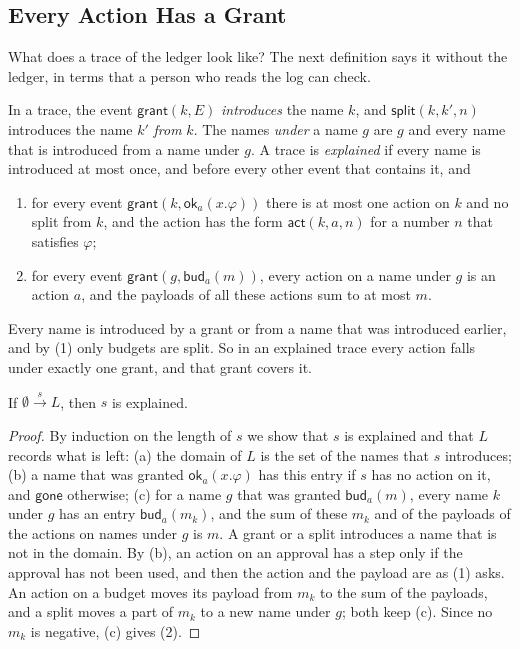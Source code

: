\documentclass[acmsmall,nonacm,screen]{acmart}
\newcommand{\kw}[1]{\mathsf{#1}}
\newcommand{\ok}[2]{\kw{ok}_{#1}(#2)}
\newcommand{\bud}[2]{\kw{bud}_{#1}(#2)}
\newcommand{\gone}{\kw{gone}}
\newcommand{\lstep}[1]{\xrightarrow{\,#1\,}}
\newcommand{\grant}{\kw{grant}}
\newcommand{\evact}{\kw{act}}
\newcommand{\evsplit}{\kw{split}}
\begin{document}
\subsection{Every Action Has a Grant}

What does a trace of the ledger look like? The next definition says it without the ledger, in
terms that a person who reads the log can check.

\begin{definition}
\label{def:explained}
In a trace, the event $\grant(k, E)$ \emph{introduces} the name $k$, and
$\evsplit(k, k', n)$ introduces the name $k'$ \emph{from} $k$. The names \emph{under} a name
$g$ are $g$ and every name that is introduced from a name under $g$. A trace is
\emph{explained} if every name is introduced at most once, and before every other event that
contains it, and
\begin{enumerate}
\item for every event $\grant(k, \ok{a}{x.\varphi})$ there is at most one action on $k$ and
  no split from $k$, and the action has the form $\evact(k, a, n)$ for a number $n$ that
  satisfies $\varphi$;
\item for every event $\grant(g, \bud{a}{m})$, every action on a name under $g$ is an action
  $a$, and the payloads of all these actions sum to at most $m$.
\end{enumerate}
\end{definition}

Every name is introduced by a grant or from a name that was introduced earlier, and by (1)
only budgets are split. So in an explained trace every action falls under exactly one grant,
and that grant covers it.

\begin{lemma}
\label{lem:ledger}
If $\emptyset \lstep{s} L$, then $s$ is explained.
\end{lemma}

\begin{proof}
By induction on the length of $s$ we show that $s$ is explained and that $L$ records what is
left: (a) the domain of $L$ is the set of the names that $s$ introduces; (b) a name that was
granted $\ok{a}{x.\varphi}$ has this entry if $s$ has no action on it, and $\gone$ otherwise;
(c) for a name $g$ that was granted $\bud{a}{m}$, every name $k$ under $g$ has an entry
$\bud{a}{m_k}$, and the sum of these $m_k$ and of the payloads of the actions on names under
$g$ is $m$. A grant or a split introduces a name that is not in the domain. By (b), an action
on an approval has a step only if the approval has not been used, and then the action and the
payload are as (1) asks. An action on a budget moves its payload from $m_k$ to the sum of the
payloads, and a split moves a part of $m_k$ to a new name under $g$; both keep (c). Since no
$m_k$ is negative, (c) gives (2).
\end{proof}
\end{document}
